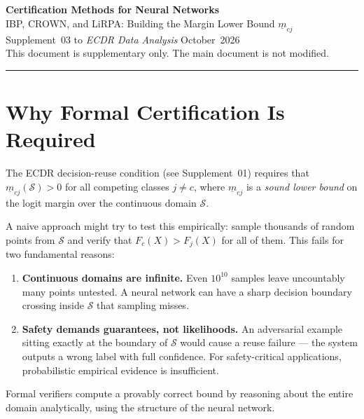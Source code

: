 \documentclass[11pt, a4paper]{article}
\theoremstyle{definition}
\theoremstyle{plain}
\begin{document}
\begin{center}
  {\LARGE\bfseries\color{teal} Certification Methods for Neural Networks}\\[0.5em]
  {\large\color{muted} IBP, CROWN, and LiRPA: Building the Margin Lower Bound $\underline{m}_{cj}$}\\[1.2em]
  {\normalsize Supplement~03 to \textit{ECDR Data Analysis} \textbar{} October~2026}\\[0.3em]
  {\small\color{muted} This document is supplementary only. The main document is not modified.}
\end{center}

\vspace{1em}\hrule\vspace{1em}

\tableofcontents
\clearpage

\section{Why Formal Certification Is Required}

The ECDR decision-reuse condition (see Supplement~01) requires that
$\underline{m}_{cj}(\mathcal{S}) > 0$ for all competing classes $j \ne c$,
where $\underline{m}_{cj}$ is a \emph{sound lower bound} on the logit margin
over the continuous domain $\mathcal{S}$.

A naive approach might try to test this empirically: sample thousands of random
points from $\mathcal{S}$ and verify that $F_c(X) > F_j(X)$ for all of them.
This fails for two fundamental reasons:

\begin{enumerate}
  \item \textbf{Continuous domains are infinite.} Even $10^{10}$ samples leave
        uncountably many points untested. A neural network can have a sharp
        decision boundary crossing inside $\mathcal{S}$ that sampling misses.
  \item \textbf{Safety demands guarantees, not likelihoods.} An adversarial example
        sitting exactly at the boundary of $\mathcal{S}$ would cause a reuse failure
        — the system outputs a wrong label with full confidence. For safety-critical
        applications, probabilistic empirical evidence is insufficient.
\end{enumerate}

Formal verifiers compute a provably correct bound by reasoning about the entire
domain analytically, using the structure of the neural network.
\end{document}
